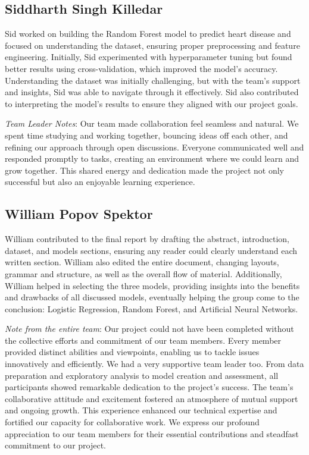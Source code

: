 \subsection{Siddharth Singh Killedar}
Sid worked on building the Random Forest model to predict heart disease and focused on understanding the dataset, ensuring proper preprocessing and feature engineering. Initially, Sid experimented with hyperparameter tuning but found better results using cross-validation, which improved the model's accuracy. Understanding the dataset was initially challenging, but with the team's support and insights, Sid was able to navigate through it effectively. Sid also contributed to interpreting the model's results to ensure they aligned with our project goals.

\textit{Team Leader Notes}: Our team made collaboration feel seamless and natural. We spent time studying and working together, bouncing ideas off each other, and refining our approach through open discussions. Everyone communicated well and responded promptly to tasks, creating an environment where we could learn and grow together. This shared energy and dedication made the project not only successful but also an enjoyable learning experience.

\subsection{William Popov Spektor}
William contributed to the final report by drafting the abstract, introduction, dataset, and models sections, ensuring any reader could clearly understand each written section. William also edited the entire document, changing layouts, grammar and structure, as well as the overall flow of material. Additionally, William helped in selecting the three models, providing insights into the benefits and drawbacks of all discussed models, eventually helping the group come to the conclusion: Logistic Regression, Random Forest, and Artificial Neural Networks.


\textit{Note from the entire team}: Our project could not have been completed without the collective efforts and commitment of our team members. Every member provided distinct abilities and viewpoints, enabling us to tackle issues innovatively and efficiently. We had a very supportive team leader too. From data preparation and exploratory analysis to model creation and assessment, all participants showed remarkable dedication to the project's success.
The team's collaborative attitude and excitement fostered an atmosphere of mutual support and ongoing growth. This experience enhanced our technical expertise and fortified our capacity for collaborative work. We express our profound appreciation to our team members for their essential contributions and steadfast commitment to our project.
